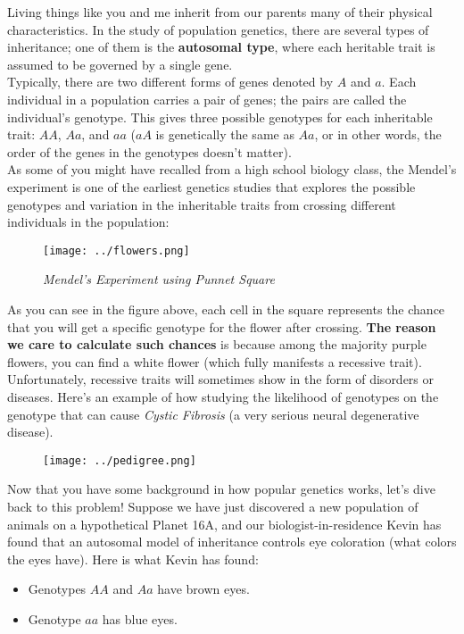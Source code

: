 
Living things like you and me inherit from our parents many of their physical characteristics. In the study of population genetics, there are several types of inheritance; one of them is the \textbf{autosomal type}, where each heritable trait is assumed to be governed by a single gene. \\

Typically, there are two different forms of genes denoted by $A$ and $a$. Each individual in a population carries a pair of genes; the pairs are called the individual's genotype. This gives three possible genotypes for each inheritable trait: $AA$, $Aa$, and $aa$ ($aA$ is genetically the same as $Aa$, or in other words, the order of the genes in the genotypes doesn't matter). \\

As some of you might have recalled from a high school biology class, the Mendel's experiment is one of the earliest genetics studies that explores the possible genotypes and variation in the inheritable traits from crossing different individuals in the population:
\begin{figure}[H]
    \centering
    \texttt{[image: ../flowers.png]}
    \caption*{\textit{Mendel's Experiment using Punnet Square}}
\end{figure}

As you can see in the figure above, each cell in the square represents the chance that you will get a specific genotype for the flower after crossing. \textbf{The reason we care to calculate such chances} is because among the majority purple flowers, you can find a white flower (which fully manifests a recessive trait). Unfortunately, recessive traits will sometimes show in the form of disorders or diseases. Here's an example of how studying the likelihood of genotypes on the genotype that can cause \textit{Cystic Fibrosis} (a very serious neural degenerative disease).
\begin{figure}[H]
    \centering
    \texttt{[image: ../pedigree.png]}
\end{figure}
Now that you have some background in how popular genetics works, let's dive back to this problem! Suppose we have just discovered a new population of animals on a hypothetical Planet 16A, and our biologist-in-residence Kevin has found that an autosomal model of inheritance controls eye coloration (what colors the eyes have). Here is what Kevin has found:
\begin{itemize}
    \item Genotypes $AA$ and $Aa$ have brown eyes.
    \item Genotype $aa$ has blue eyes.
\end{itemize}

